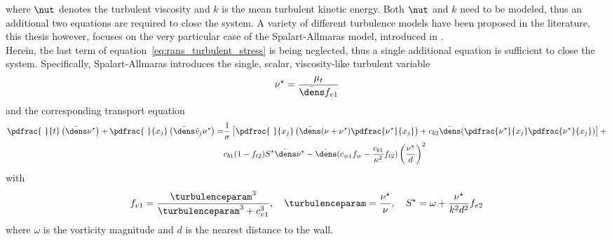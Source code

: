 \documentclass[../main.tex]{subfiles}
\begin{document}
where $\nut$ denotes the turbulent viscosity and $k$ is the mean turbulent kinetic energy. Both $\nut$ and $k$ need to be modeled, thus an additional two equations are required to close the system. A variety of different turbulence models have been proposed in the literature, this thesis however, focuses on the very particular case of the Spalart-Allmaras model, introduced in \cite{Spalart1994}.\\
Herein, the last term of equation~\eqref{eq:rans_turbulent_stress} is being neglected, thus a single additional equation is sufficient to close the system.
Specifically, Spalart-Allmaras introduces the single, scalar, viscosity-like turbulent variable
\begin{align}
\nu^{\star}=\frac{\mu_t}{\bar{\dens} f_{v1}}
\end{align}
and the corresponding transport equation
\begin{align}
\pdfrac{~}{t}\left( \bar{\dens} \nu^{\star}\right) + \pdfrac{~}{x_j}\left( \bar{\dens}\bar{v}_j \nu^{\star} \right) = 
&\frac{1}{\sigma}\left[ \pdfrac{~}{x_j} \left( \bar{\dens}(\nu+\nu^{\star})\pdfrac{\nu^{\star}}{x_j} \right) + c_{b2} \bar{\dens}(\pdfrac{\nu^{\star}}{x_j}\pdfrac{\nu^{\star}}{x_j})\right]+\nonumber\\
&c_{b1}(1-f_{t2}) S^{\star} \bar{\dens}\nu^{\star}-\bar{\dens}(c_{w1}f_{w}-\frac{c_{b1}}{\kappa^2} f_{t2})
\left(\frac{\nu^{\star}}{d}\right)^{2}
\end{align}
with
\begin{align}
f_{v1}=\frac{\turbulenceparam^3}{\turbulenceparam^3+c_{v1}^3},~~~\turbulenceparam=\frac{\nu^{\star}}{\nu},~~~S^{\star}=\omega+\frac{\nu^{\star}}{k^2d^2}f_{v2}
\end{align}
where $\omega$ is the vorticity magnitude and $d$ is the nearest distance to the wall.
\end{document}
